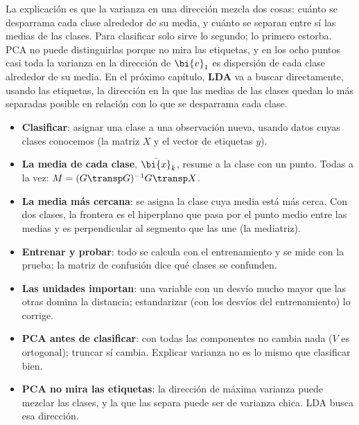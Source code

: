 La explicación es que la varianza en una dirección mezcla dos cosas: cuánto se
desparrama cada clase alrededor de su media, y cuánto se separan entre sí las
medias de las clases. Para clasificar solo sirve lo segundo; lo primero
estorba. PCA no puede distinguirlas porque no mira las etiquetas, y en los
ocho puntos casi toda la varianza en la dirección de $\bi{v}_1$ es dispersión de
cada clase alrededor de su media. En el próximo capítulo, \textbf{LDA} va a
buscar directamente, usando las etiquetas, la dirección en la que las medias de las clases quedan lo más
separadas posible en relación con lo que se desparrama cada clase.


\begin{ideas}[frametitle={Ideas clave},frametitlefont=\bfseries\large,frametitlebelowskip=4pt]
\begin{itemize}[leftmargin=*,itemsep=2pt]
\item \textbf{Clasificar}: asignar una clase a una observación nueva, usando
datos cuyas clases conocemos (la matriz $X$ y el vector de etiquetas $y$).
\item \textbf{La media de cada clase}, $\bar{\bi{x}}_k$, resume a la clase con un
punto. Todas a la vez: $M=(G\transp G)^{-1}G\transp X$.
\item \textbf{La media más cercana}: se asigna la clase cuya media está más
cerca. Con dos clases, la frontera es el hiperplano que pasa por el punto
medio entre las medias y es perpendicular al segmento que las une (la
mediatriz).
\item \textbf{Entrenar y probar}: todo se calcula con el entrenamiento y se
mide con la prueba; la matriz de confusión dice qué clases se confunden.
\item \textbf{Las unidades importan}: una variable con un desvío mucho mayor
que las otras domina la distancia; estandarizar (con los desvíos del
entrenamiento) lo corrige.
\item \textbf{PCA antes de clasificar}: con todas las componentes no cambia
nada ($V$ es ortogonal); truncar sí cambia. Explicar varianza no es lo mismo
que clasificar bien.
\item \textbf{PCA no mira las etiquetas}: la dirección de máxima varianza
puede mezclar las clases, y la que las separa puede ser de varianza chica. LDA
busca esa dirección.
\end{itemize}
\end{ideas}

